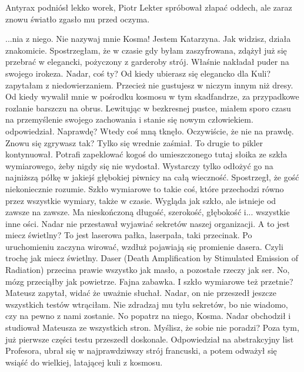 \divider{}

Antyrax podniósł lekko worek, Piotr Lekter spróbował złapać oddech, ale zaraz znowu światło zgasło mu przed oczyma.

\divider{}

\begin{dialogue}
...nia z niego. \dm{} Nie nazywaj mnie Kosma! Jestem Katarzyna.
\ds{} Jak widzisz, działa znakomicie. \dm{} Spostrzegłam, że w czasie gdy byłam zaszyfrowana, zdążył już się przebrać w elegancki, pożyczony z garderoby strój. 
Właśnie nakładał puder na swojego irokeza.
\ds{} Nadar, coś ty? Od kiedy ubierasz się elegancko dla Kuli? \dm{} zapytałam z niedowierzaniem. \dm{} Przecież nie gustujesz w niczym innym niż dresy.
\ds{} Od kiedy wywalił mnie w pośrodku kosmosu w tym skadfandrze, za przypadkowe rozlanie barszczu na obrus. 
Lewitując w bezkresnej pustce, miałem sporo czasu na przemyślenie swojego zachowania i stanie się nowym człowiekiem. \dm{} odpowiedział.
\ds{} Naprawdę? \dm{} Wtedy coś mną tknęło. \dm{} Oczywiście, że nie na prawdę. Znowu się zgrywasz tak? \dm{} Tylko się wrednie zaśmiał.
\ds{} To drugie to pikler \dm{} kontynuował. \dm{} Potrafi zapeklować kogoś do umieszczonego tutaj słoika ze szkła wymiarowego, żeby nigdy się nie wydostał.
Wystarczy tylko odłożyć go na najniższą półkę w jakiejś głębokiej piwnicy na całą wieczność.
\dm{} Spostrzegł, że gość niekoniecznie rozumie. \dm{}
Szkło wymiarowe to takie coś, które przechodzi równo przez wszystkie wymiary, także w czasie. 
Wygląda jak szkło, ale istnieje od zawsze na zawsze. 
Ma nieskończoną długość, szerokość, głębokość i... wszystkie inne ości. \dm{}
Nadar nie przestawał wyjawiać sekretów naszej organizacji.
\ds{} A to jest miecz świetlny?
\ds{} To jest laserowa pałka, laserpała, taki przecinak.
Po uruchomieniu zaczyna wirować, wzdłuż pojawiają się promienie dasera. Czyli trochę jak miecz świetlny.
Daser (Death Amplification by Stimulated Emission of Radiation) przecina prawie wszystko jak masło, a pozostałe rzeczy jak ser. 
No, mózg przeciąłby jak powietrze.
Fajna zabawka.
\ds{} I szkło wymiarowe też przetnie? \ds{} Mateusz zapytał, widać że uważnie słuchał.
\ds{} Nadar, on nie przeszedł jeszcze wszystkich testów \dm{} wtrąciłam. \dm{} Nie zdradzaj mu tylu sekretów, bo nie wiadomo, czy na pewno z nami zostanie.
\ds{} No popatrz na niego, Kosma. \dm{} Nadar obchodził i studiował Mateusza ze wszystkich stron. \dm{} Myślisz, że sobie nie poradzi?
Poza tym, już pierwsze części testu przeszedł doskonale. 
Odpowiedział na abstrakcyjny list Profesora, ubrał się w najprawdziwszy strój francuski, a potem odważył się wsiąść do wielkiej, latającej kuli z kosmosu.

\end{dialogue}
